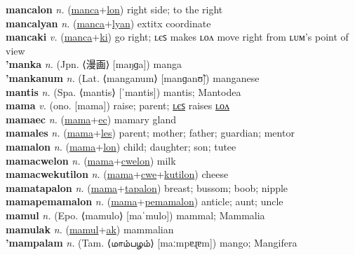 \textbf{mancalon} \textit{n.} (\hyperref[manca]{manca}+\hyperref[lon]{lon})
right side; to the right \label{mancalon} \\
\textbf{mancalyan} \textit{n.} (\hyperref[manca]{manca}+\hyperref[lyan]{lyan})
	extit{x} coordinate \label{mancalyan} \\
\textbf{mancaki} \textit{v.} (\hyperref[manca]{manca}+\hyperref[ki]{ki})
go right; ʟєꜱ makes ʟᴏᴧ move right from ʟᴜᴍ's point of view \label{mancaki} \\
\textbf{'manka} \textit{n.} (Jpn. ⟨漫画⟩ [maŋɡa])
manga \label{'manka} \\
\textbf{'mankanum} \textit{n.} (Lat. ⟨manganum⟩ [manɡanʊ̃])
manganese \label{'mankanum} \\
\textbf{mantis} \textit{n.} (Spa. ⟨mantis⟩ [ˈmantis])
mantis; Mantodea \label{mantis} \\
\textbf{mama} \textit{v.} (ono. [mama])
raise; parent; \hyperref[mamales]{ʟєꜱ} raises \hyperref[mamalon]{ʟᴏᴧ} \label{mama} \\
\textbf{mamaec} \textit{n.} (\hyperref[mama]{mama}+\hyperref[ec]{ec})
mamary gland \label{mamaec} \\
\textbf{mamales} \textit{n.} (\hyperref[mama]{mama}+\hyperref[les]{les})
parent; mother; father; guardian; mentor \label{mamales} \\
\textbf{mamalon} \textit{n.} (\hyperref[mama]{mama}+\hyperref[lon]{lon})
child; daughter; son; tutee \label{mamalon} \\
\textbf{mamacwelon} \textit{n.} (\hyperref[mama]{mama}+\hyperref[cwelon]{cwelon})
milk \label{mamacwelon} \\
\textbf{mamacwekutilon} \textit{n.} (\hyperref[mama]{mama}+\hyperref[cwe]{cwe}+\hyperref[kutilon]{kutilon})
cheese \label{mamacwekutilon} \\
\textbf{mamatapalon} \textit{n.} (\hyperref[mama]{mama}+\hyperref[tapalon]{tapalon})
breast; bussom; boob; nipple \label{mamatapalon} \\
\textbf{mamapemamalon} \textit{n.} (\hyperref[mama]{mama}+\hyperref[pemamalon]{pemamalon})
anticle; aunt; uncle \label{mamapemamalon} \\
\textbf{mamul} \textit{n.} (Epo. ⟨mamulo⟩ [maˈmulo])
mammal; Mammalia \label{mamul} \\
\textbf{mamulak} \textit{n.} (\hyperref[mamul]{mamul}+\hyperref[ak]{ak})
mammalian \label{mamulak} \\
\textbf{'mampalam} \textit{n.} (Tam. ⟨மாம்பழம்⟩ [maːmpɐɻɐm])
mango; Mangifera \label{'mampalam} \\
